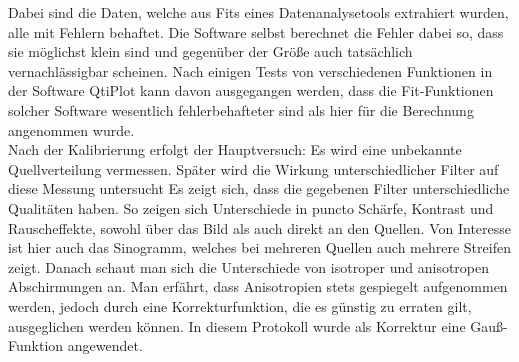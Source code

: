 Dabei sind die Daten, welche aus Fits eines Datenanalysetools extrahiert wurden, alle mit Fehlern behaftet. Die Software selbst berechnet die Fehler dabei so, dass
sie möglichst klein sind und gegenüber der Größe auch tatsächlich vernachlässigbar scheinen. Nach einigen Tests von verschiedenen Funktionen in der Software QtiPlot
kann davon ausgegangen werden, dass die Fit-Funktionen solcher Software wesentlich fehlerbehafteter sind als hier für die Berechnung angenommen wurde.\\
Nach der Kalibrierung erfolgt der Hauptversuch: Es wird eine unbekannte Quellverteilung vermessen. Später wird die Wirkung unterschiedlicher Filter auf diese Messung untersucht
Es zeigt sich, dass die gegebenen Filter unterschiedliche Qualitäten haben. So zeigen sich Unterschiede in puncto Schärfe, Kontrast und Rauscheffekte, sowohl über das Bild als auch direkt an den Quellen.
Von Interesse ist hier auch das Sinogramm, welches bei mehreren Quellen auch mehrere Streifen zeigt. 
Danach schaut man sich die Unterschiede von isotroper und anisotropen Abschirmungen an. Man erfährt, dass Anisotropien stets gespiegelt aufgenommen werden, jedoch durch eine 
Korrekturfunktion, die es günstig zu erraten gilt, ausgeglichen werden können. 
In diesem Protokoll wurde als Korrektur eine Gauß-Funktion angewendet.